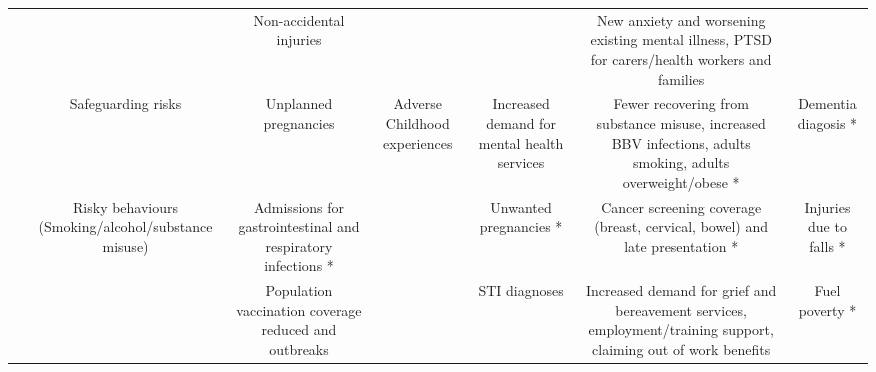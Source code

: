 \begin{table*}[]
{\begin{tabular}{@{}lcccccc@{}}
    \rowcolor[HTML]{9698ED} 
    \multirow{-4}{*}{\cellcolor[HTML]{9698ED}Short term}  &                                                                     & Non-accidental injuries                                                                                                                              &                                                      &                                                                            & New anxiety and worsening existing mental illness, PTSD for carers/health workers and families                                          &                                                          \\
    \rowcolor[HTML]{CBCEFB} 
    \cellcolor[HTML]{CBCEFB}                              & Safeguarding risks                                                  & Unplanned pregnancies                                                                                                                                & Adverse Childhood experiences                        & Increased demand for mental health services                                & Fewer recovering from substance misuse, increased BBV infections, adults smoking, adults overweight/obese *                             & Dementia diagosis *                                      \\
    \rowcolor[HTML]{CBCEFB} 
    \cellcolor[HTML]{CBCEFB}                              & Risky behaviours (Smoking/alcohol/substance misuse)                 & Admissions for gastrointestinal and respiratory infections *                                                                                         &                                                      & Unwanted pregnancies *                                                     & Cancer screening coverage (breast, cervical, bowel) and late presentation *                                                             & Injuries due to falls *                                  \\
    \rowcolor[HTML]{CBCEFB} 
    \cellcolor[HTML]{CBCEFB}                              &                                                                     & Population vaccination coverage reduced and outbreaks                                                                                                &                                                      & STI diagnoses                                                              & Increased demand for grief and bereavement services, employment/training support, claiming out of work benefits                         & Fuel poverty *                                           \\

\end{tabular}}
\end{table*}
